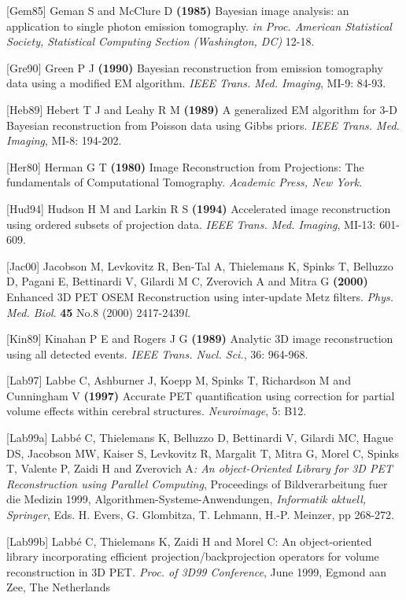 \documentclass{article}
\begin{document}
{[}Gem85] Geman S and McClure D \textbf{(1985)} Bayesian image analysis: 
an application to single photon emission tomography. \textit{in Proc. 
American Statistical Society, Statistical Computing Section (Washington, 
DC)} 12-18.


 {[}Gre90] Green P J \textbf{(1990)} Bayesian reconstruction from emission 
tomography data using a modified EM algorithm. \textit{IEEE Trans. 
Med. Imaging}, MI-9: 84-93.


{[}Heb89] Hebert T J and Leahy R M \textbf{(1989)} A generalized EM 
algorithm for 3-D Bayesian reconstruction from Poisson data using 
Gibbs priors. \textit{IEEE Trans. Med. Imaging}, MI-8: 194-202.


{[}Her80] Herman G T \textbf{(1980)} Image Reconstruction from Projections: 
The fundamentals of Computational Tomography. \textit{Academic Press, 
New York}.

{[}Hud94] Hudson H M and Larkin R S \textbf{(1994)} Accelerated image 
reconstruction using ordered subsets of projection data. \textit{IEEE 
Trans. Med. Imaging}, MI-13: 601-609.


{[}Jac00] Jacobson M, Levkovitz R, Ben-Tal A, Thielemans K, Spinks 
T, Belluzzo D, Pagani E, Bettinardi V, Gilardi M C, Zverovich 
A and Mitra G \textbf{(2000)} Enhanced 3D PET OSEM Reconstruction 
using inter-update Metz filters. \textit{Phys. Med. Biol}. \textbf{45} No.8 
(2000) 2417-2439\textit{l.}


{[}Kin89] Kinahan P E and Rogers J G \textbf{(1989)} Analytic 3D image 
reconstruction using all detected events. \textit{IEEE Trans. Nucl. 
Sci.}, 36: 964-968.


{[}Lab97] Labbe C, Ashburner J, Koepp M, Spinks T, Richardson M 
and Cunningham V \textbf{(1997)} Accurate PET quantification using 
correction for partial volume effects within cerebral structures. \textit{Neuroimage}, 
5: B12.


{[}Lab99a] Labb\'{e} C, Thielemans K, Belluzzo D, Bettinardi V, Gilardi 
MC, Hague DS, Jacobson MW, Kaiser S, Levkovitz R, Margalit T, 
Mitra G, Morel C, Spinks T, Valente P, Zaidi H and Zverovich A\textit{: 
An object-Oriented Library for 3D PET Reconstruction using Parallel 
Computing}, Proceedings of Bildverarbeitung fuer die Medizin 
1999, Algorithmen-Systeme-Anwendungen, \textit{Informatik} 
\textit{aktuell, Springer}, Eds. H. Evers, G. Glombitza, T. Lehmann, 
H.-P. Meinzer, pp 268-272. 

{[}Lab99b] Labb\'{e} C, Thielemans K, Zaidi H and Morel C: An object-oriented 
library incorporating efficient projection/backprojection operators 
for volume reconstruction in 3D PET\textit{. Proc. of 3D99 Conference}, 
June 1999, Egmond aan Zee, The Netherlands 
\end{document}
